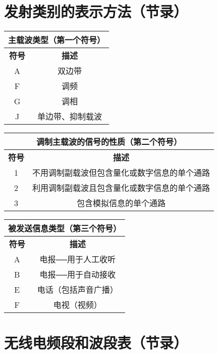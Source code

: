\newpage



\section{发射类别的表示方法（节录）}

\begin{tabular}{|c|c|}
	\hline
	\multicolumn{2}{|c|}{\textbf{主载波类型（第一个符号）}} \\
	\hline
	\textbf{符号} & \textbf{描述} \\
	\hline
	A & 双边带 \\
	\hline
	F & 调频 \\
	\hline
	G & 调相 \\
	\hline
	J & 单边带、抑制载波 \\
	\hline
\end{tabular}

\bigskip

\begin{tabular}{|c|c|}
	\hline
	\multicolumn{2}{|c|}{\textbf{调制主载波的信号的性质（第二个符号）}} \\
	\hline
	\textbf{符号} & \textbf{描述} \\
	\hline
	1 & 不用调制副载波但包含量化或数字信息的单个通路 \\
	\hline
	2 & 利用调制副载波且包含量化或数字信息的单个通路 \\
	\hline
	3 & 包含模拟信息的单个通路 \\
	\hline
\end{tabular}

\bigskip

\begin{tabular}{|c|c|}
	\hline
	\multicolumn{2}{|c|}{\textbf{被发送信息类型（第三个符号）}} \\
	\hline
	\textbf{符号} & \textbf{描述} \\
	\hline
	A & 电报──用于人工收听 \\
	\hline
	B & 电报──用于自动接收 \\
	\hline
	E & 电话（包括声音广播） \\
	\hline
	F & 电视（视频） \\
	\hline
\end{tabular}

\newpage

\section{无线电频段和波段表（节录）}


